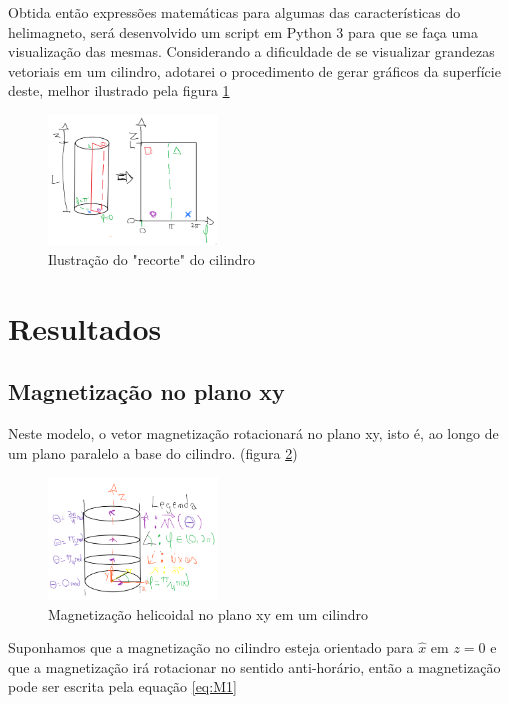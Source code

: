 \documentclass[a4paper, 12pt, twocolumn]{article}
\begin{document}
Obtida então expressões matemáticas para algumas das características do helimagneto, será desenvolvido um script em Python 3 para que se faça uma visualização das mesmas. Considerando a dificuldade de se visualizar grandezas vetoriais em um cilindro, adotarei o procedimento de gerar gráficos da superfície deste, melhor ilustrado pela figura \ref{fig:recorte}

\begin{figure}
    \caption{Ilustração do "recorte" do cilindro}
    \label{fig:recorte}
    \centering
    \includegraphics[width=0.4\textwidth]{recorte.png}
\end{figure}

\section{Resultados}

\subsection{Magnetização no plano xy}

Neste modelo, o vetor magnetização rotacionará no plano xy, isto é, ao longo de um plano paralelo a base do cilindro. (figura \ref{fig:magnetizacao_xy})

\begin{figure}
    \caption{Magnetização helicoidal 
    no plano xy em um cilindro}
    \label{fig:magnetizacao_xy}
    \centering
    \includegraphics[width=0.4\textwidth]{magnetizacao_xy.png}
\end{figure}

Suponhamos que a magnetização no cilindro esteja orientado para $\hat{x}$ em $z=0$ e que a magnetização irá rotacionar no sentido anti-horário, então a magnetização pode ser escrita pela equação \ref{eq:M1}
\end{document}
